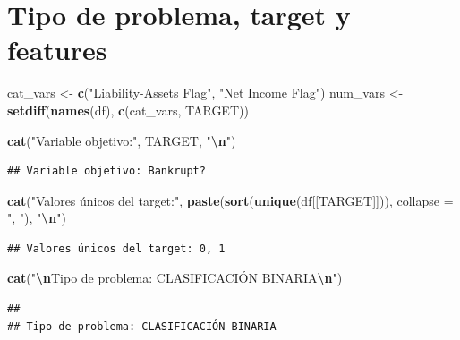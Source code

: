 \documentclass[
]{book}
\newenvironment{Shaded}{\begin{snugshade}}{\end{snugshade}}
\newcommand{\AttributeTok}[1]{\textcolor[rgb]{0.13,0.29,0.53}{#1}}
\newcommand{\FunctionTok}[1]{\textcolor[rgb]{0.13,0.29,0.53}{\textbf{#1}}}
\newcommand{\NormalTok}[1]{#1}
\newcommand{\OtherTok}[1]{\textcolor[rgb]{0.56,0.35,0.01}{#1}}
\newcommand{\SpecialCharTok}[1]{\textcolor[rgb]{0.81,0.36,0.00}{\textbf{#1}}}
\newcommand{\StringTok}[1]{\textcolor[rgb]{0.31,0.60,0.02}{#1}}
\begin{document}
\section{Tipo de problema, target y features}\label{tipo-de-problema-target-y-features}

\begin{Shaded}
\begin{Highlighting}[]
\NormalTok{cat\_vars }\OtherTok{\textless{}{-}} \FunctionTok{c}\NormalTok{(}\StringTok{"Liability{-}Assets Flag"}\NormalTok{, }\StringTok{"Net Income Flag"}\NormalTok{)}
\NormalTok{num\_vars }\OtherTok{\textless{}{-}} \FunctionTok{setdiff}\NormalTok{(}\FunctionTok{names}\NormalTok{(df), }\FunctionTok{c}\NormalTok{(cat\_vars, TARGET))}

\FunctionTok{cat}\NormalTok{(}\StringTok{"Variable objetivo:"}\NormalTok{, TARGET, }\StringTok{"}\SpecialCharTok{\textbackslash{}n}\StringTok{"}\NormalTok{)}
\end{Highlighting}
\end{Shaded}

\begin{verbatim}
## Variable objetivo: Bankrupt?
\end{verbatim}

\begin{Shaded}
\begin{Highlighting}[]
\FunctionTok{cat}\NormalTok{(}\StringTok{"Valores únicos del target:"}\NormalTok{, }\FunctionTok{paste}\NormalTok{(}\FunctionTok{sort}\NormalTok{(}\FunctionTok{unique}\NormalTok{(df[[TARGET]])), }\AttributeTok{collapse =} \StringTok{", "}\NormalTok{), }\StringTok{"}\SpecialCharTok{\textbackslash{}n}\StringTok{"}\NormalTok{)}
\end{Highlighting}
\end{Shaded}

\begin{verbatim}
## Valores únicos del target: 0, 1
\end{verbatim}

\begin{Shaded}
\begin{Highlighting}[]
\FunctionTok{cat}\NormalTok{(}\StringTok{"}\SpecialCharTok{\textbackslash{}n}\StringTok{Tipo de problema: CLASIFICACIÓN BINARIA}\SpecialCharTok{\textbackslash{}n}\StringTok{"}\NormalTok{)}
\end{Highlighting}
\end{Shaded}

\begin{verbatim}
## 
## Tipo de problema: CLASIFICACIÓN BINARIA
\end{verbatim}
\end{document}
